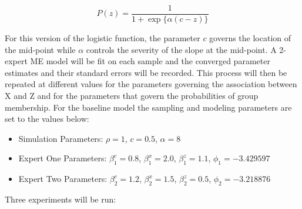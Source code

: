 \documentclass[12pt]{article}
\theoremstyle{definition}
\begin{document}
\begin{equation} \label{eq:general_logistic}
    P(z) = \frac{1}{1 + \exp\{\alpha (c - z)\}}
\end{equation}

For this version of the logistic function, the parameter $c$ governs the location of the mid-point while $\alpha$ controls the severity of the slope at the mid-point. A 2-expert ME model will be fit on each sample and the converged parameter estimates and their standard errors will be recorded. This process will then be repeated at different values for the parameters governing the association between X and Z and for the parameters that govern the probabilities of group membership. For the baseline model the sampling and modeling parameters are set to the values below:

\begin{itemize}
    \item Simulation Parameters: $\rho = 1$,\; $c = 0.5$,\; $\alpha = 8$
    \item Expert One Parameters: $\beta_{1}^{c} = 0.8$, \; $\beta_{1}^{x} = 2.0$, \; $\beta_{1}^{z} = 1.1$, \; $\phi_{1} = -3.429597$
    \item Expert Two Parameters: $\beta_{2}^{c} = 1.2$, \; $\beta_{2}^{x} = 1.5$, \; $\beta_{2}^{z} = 0.5$, \; $\phi_{2} = -3.218876$
\end{itemize}

Three experiments will be run:
\end{document}
